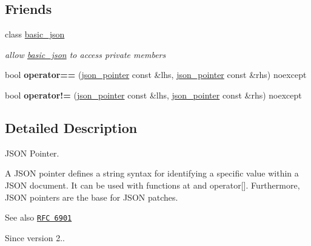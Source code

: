 \subsection*{Friends}
\begin{DoxyCompactItemize}
\item 
class \hyperlink{classnlohmann_1_1json__pointer_ada3100cdb8700566051828f1355fa745}{basic\+\_\+json}\hypertarget{classnlohmann_1_1json__pointer_ada3100cdb8700566051828f1355fa745}{}\label{classnlohmann_1_1json__pointer_ada3100cdb8700566051828f1355fa745}

\begin{DoxyCompactList}\small\item\em allow \hyperlink{classnlohmann_1_1basic__json}{basic\+\_\+json} to access private members \end{DoxyCompactList}\item 
bool {\bfseries operator==} (\hyperlink{classnlohmann_1_1json__pointer}{json\+\_\+pointer} const \&lhs, \hyperlink{classnlohmann_1_1json__pointer}{json\+\_\+pointer} const \&rhs) noexcept\hypertarget{classnlohmann_1_1json__pointer_a4667ef558c8c3f8a646bfda0c6654653}{}\label{classnlohmann_1_1json__pointer_a4667ef558c8c3f8a646bfda0c6654653}

\item 
bool {\bfseries operator!=} (\hyperlink{classnlohmann_1_1json__pointer}{json\+\_\+pointer} const \&lhs, \hyperlink{classnlohmann_1_1json__pointer}{json\+\_\+pointer} const \&rhs) noexcept\hypertarget{classnlohmann_1_1json__pointer_a6779edcf28e6f018a3bbb29c0b4b5e1e}{}\label{classnlohmann_1_1json__pointer_a6779edcf28e6f018a3bbb29c0b4b5e1e}

\end{DoxyCompactItemize}


\subsection{Detailed Description}
J\+S\+ON Pointer. 

A J\+S\+ON pointer defines a string syntax for identifying a specific value within a J\+S\+ON document. It can be used with functions {\ttfamily at} and {\ttfamily operator\mbox{[}\mbox{]}}. Furthermore, J\+S\+ON pointers are the base for J\+S\+ON patches.

\begin{DoxySeeAlso}{See also}
\href{https://tools.ietf.org/html/rfc6901}{\tt R\+FC 6901}
\end{DoxySeeAlso}
\begin{DoxySince}{Since}
version 2.. 
\end{DoxySince}


